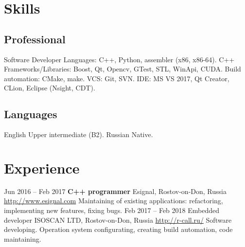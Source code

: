 \documentclass[11pt,a4paper]{moderncv}
\newcommand{\EngRus}[2]{#1}
\newcommand{\BirthPlaceOfValour}{\EngRus{Rostov-on-Don, Russia}{Ростов-на-Дону, Россия}}
\begin{document}
\maketitle

\section{\EngRus{Skills}{Навыки}}
  \subsection{\EngRus{Professional}{Профессиональные}}
    \cvline
    {\EngRus{Software Developer}{Разработчик программного обеспечения}}
      {
      \EngRus{Languages}{Языки}: C++, Python, assembler (x86, x86-64).\newline{}
      \EngRus{C++ Frameworks/Libraries}{C++ Фреймворки/Библиотеки}: Boost, Qt, Opencv, GTest, STL, WinApi, CUDA.\newline{}
      \EngRus{Build automation}{Системы автоматизации сборки}: CMake, make.\newline{}
      \EngRus{VCS}{Системы управления версиями}: Git, SVN.\newline{}
      IDE: MS VS 2017, Qt Creator, CLion, Eclipse (Nsight, CDT).
      }
  \subsection{\EngRus{Languages}{Языки}}
    \cvline
    {\EngRus{English}{Английский}}
      {
      \EngRus{Upper intermediate}{Разговорный} (B2).
      }
    \cvline
    {\EngRus{Russian}{Русский}}
      {
      \EngRus{Native}{Носитель}.
      }
    

\section{\EngRus{Experience}{Опыт}}
\cventry
  {\EngRus{Jun}{Июнь} 2016 -- \EngRus{Feb}{Февраль} 2017}
  {\bfseries \EngRus{C++ programmer}{C++ программист}}
  {Esignal, \BirthPlaceOfValour}
  {\newline{}\url{http://www.esignal.com}}{}
  {\EngRus{Maintaining of existing applications: refactoring, implementing new features, fixing bugs.}{Поддержка текущего кода: рефакторинг, исправление багов и добавление новых возможностей.}}
\cventry
  {\EngRus{Feb}{Февраль} 2017 -- \EngRus{Feb}{Февраль} 2018}
  {\EngRus{Embedded developer}{Разработчик встраиваемого ПО}}
  {\EngRus{ISOSCAN LTD}{ООО "Изоскан"}, \BirthPlaceOfValour}
  {\newline{}\url{http://r-call.ru/}}{}
  {\EngRus{Software developing. Operation system configurating, creating build automation, code maintaining.}{Разработка программного обеспечения. Настройка операционных систем, систем сборки, поддержка текущего кода.}}
\end{document}
